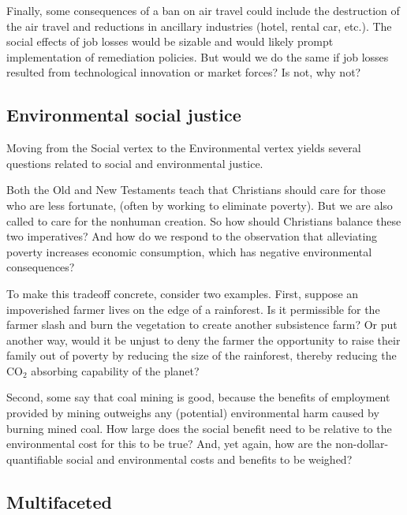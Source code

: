 \documentclass[12pt]{article}
\begin{document}
Finally, some consequences of a ban on air travel 
could include the destruction of the air travel and 
reductions in ancillary industries (hotel, rental car, etc.).
The social effects of job losses would be sizable and 
would likely prompt implementation of remediation policies.
But would we do the same if job losses resulted from technological innovation or market forces?
Is not, why not?


\subsection{Environmental social justice}
\label{sec:environmental_social_justice}

Moving from the Social vertex to the Environmental vertex 
yields several questions related to social and environmental justice. 

Both the Old and New Testaments teach that Christians should care for those who are less fortunate,
(often by working to eliminate poverty). 
But we are also called to care for the nonhuman creation.
So how should Christians balance these two imperatives?
And how do we respond to the observation that alleviating poverty 
increases economic consumption, which has negative environmental consequences?

To make this tradeoff concrete, consider two examples.
First, suppose an impoverished farmer lives on the edge of a rainforest. 
Is it permissible for the farmer slash and burn the vegetation to create another subsistence farm?
Or put another way, would it be unjust to deny the farmer the opportunity to raise their family
out of poverty by reducing the size of the rainforest, 
thereby reducing the CO$_2$ absorbing capability of the planet?

Second, some say that coal mining is good,
because the benefits of employment provided by mining outweighs
any (potential) environmental harm caused by burning mined coal. 
How large does the social benefit need to be relative to the environmental cost 
for this to be true?
And, yet again, how are the non-dollar-quantifiable 
social and environmental costs and benefits to be weighed? 


\subsection{Multifaceted}
\label{sec:multifaceted}
\end{document}
